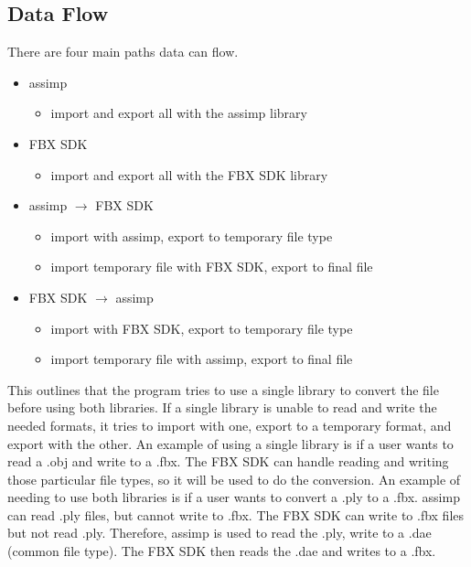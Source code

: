     \subsection{Data Flow}
        There are four main paths data can flow.
        \begin{itemize}
            \item assimp
            \begin{itemize}
                \item import and export all with the assimp library
            \end{itemize}
            
            \item FBX SDK
            \begin{itemize}
                \item import and export all with the FBX SDK library
            \end{itemize}

            \item assimp $\rightarrow$ FBX SDK
            \begin{itemize}
                \item import with assimp, export to temporary file type
                \item import temporary file with FBX SDK, export to final file 
            \end{itemize}

            \item FBX SDK $\rightarrow$ assimp
            \begin{itemize}
                \item import with FBX SDK, export to temporary file type
                \item import temporary file with assimp, export to final file 
            \end{itemize}
        \end{itemize}
        
        This outlines that the program tries to use a single library to convert the file before using both libraries.  If a single library is unable to 
        read and write the needed formats, it tries to import with one, export to a temporary format, and export with the other.  An example of 
        using a single library is if a user wants to read a .obj and write to a .fbx.  The FBX SDK can handle reading and writing those particular file
        types, so it will be used to do the conversion.  An example of needing to use both libraries is if a user wants to convert a .ply to a .fbx.
        assimp can read .ply files, but cannot write to .fbx.  The FBX SDK can write to .fbx files but not read .ply.  Therefore, assimp is used to 
        read the .ply, write to a .dae (common file type).  The FBX SDK then reads the .dae and writes to a .fbx.

